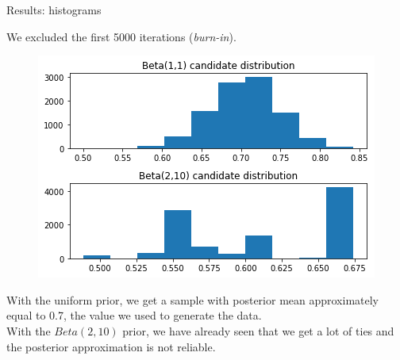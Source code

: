 \begin{frame}{Results: histograms}
	
	We excluded the first 5000 iterations (\textit{burn-in}).
	\begin{figure}
		\centering
		\includegraphics[width=0.5\columnwidth]{images/MCMC_hist.png}
	\end{figure}
	With the uniform prior, we get a sample with posterior mean approximately equal to 0.7, the value we used to generate the data.\\
	\vspace{.1in}
	With the $Beta(2,10)$ prior, we have already seen that we get a lot of ties and the posterior approximation is not reliable.
	
\end{frame}


